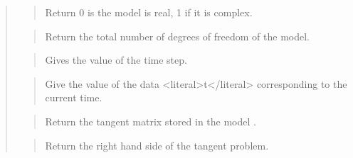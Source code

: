 \documentclass[a4paper,11pt,english]{sphinxmanual}
\begin{document}
\sphinxAtStartPar
{}
\begin{quote}

\sphinxAtStartPar
{}
\begin{quote}

\sphinxAtStartPar
Return 0 is the model is real, 1 if it is complex.
\end{quote}

\sphinxAtStartPar
{}
\begin{quote}

\sphinxAtStartPar
Return the total number of degrees of freedom of the model.
\end{quote}

\sphinxAtStartPar
{}
\begin{quote}

\sphinxAtStartPar
Gives the value of the time step.
\end{quote}

\sphinxAtStartPar
{}
\begin{quote}

\sphinxAtStartPar
Give the value of the data \textless{}literal\textgreater{}t\textless{}/literal\textgreater{} corresponding to the current time.
\end{quote}

\sphinxAtStartPar
{}
\begin{quote}

\sphinxAtStartPar
Return the tangent matrix stored in the model .
\end{quote}

\sphinxAtStartPar
{}
\begin{quote}

\sphinxAtStartPar
Return the right hand side of the tangent problem.
\end{quote}

\sphinxAtStartPar
{}
\begin{quote}


\end{quote}
\end{quote}
\end{document}

